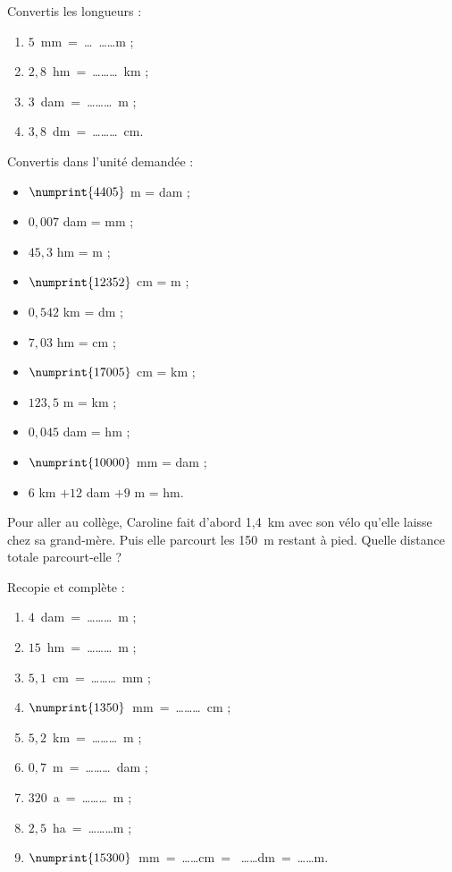 

\begin{exercice}
Convertis les longueurs :
\begin{enumerate}
 \item $5$ mm = \ldots \ldots \ldots m ;
 \item $2,8$ hm = \ldots \ldots \ldots km ;
 \item $3$ dam = \ldots \ldots \ldots m ;
 \item $3,8$ dm = \ldots \ldots \ldots cm.
 \end{enumerate}
\end{exercice}


\begin{exercice}
Convertis dans l’unité demandée :
\begin{itemize}
 \item $\numprint{4405}$ m = \dotfill dam ;
 \item $0,007$ dam = \dotfill mm ;
 \item $45,3$ hm = \dotfill m ;
 \item $\numprint{12352}$ cm = \dotfill m ;
 \item $0,542$ km = \dotfill dm ;
 \item $7,03$ hm = \dotfill cm ;
 \item $\numprint{17005}$ cm = \dotfill km ;
 \item $123,5$ m = \dotfill km ;
 \item $0,045$ dam = \dotfill hm ;
 \item $\numprint{10000}$ mm =	\dotfill dam ;
 \item $6$ km $+ 12$ dam $+ 9$ m = \dotfill hm.
 \end{itemize}
\end{exercice}


\begin{exercice}
Pour aller au collège, Caroline fait d'abord 1,4 km avec son vélo qu'elle laisse chez sa grand‑mère. Puis elle parcourt les 150 m restant à pied. Quelle distance totale parcourt‑elle ?
\end{exercice}


\begin{exercice}
Recopie et complète :
\begin{enumerate}
 \item $4$ dam = \ldots \ldots \ldots m ;
 \item $15$ hm = \ldots \ldots \ldots m ;
 \item $5,1$ cm = \ldots \ldots \ldots mm ;
 \item $\numprint{1350}$ mm = \ldots \ldots \ldots cm ;
 \item $5,2$ km = \ldots \ldots \ldots m ;
 \item $0,7$ m = \ldots \ldots \ldots dam ;
 \item $320$ a = \ldots \ldots \ldots m ;
 \item $2,5$ ha = \ldots \ldots \ldots m ;
 \item $\numprint{15300}$ mm = \ldots\ldots cm =  \ldots\ldots dm = \ldots\ldots m.
 \end{enumerate}
\end{exercice}


